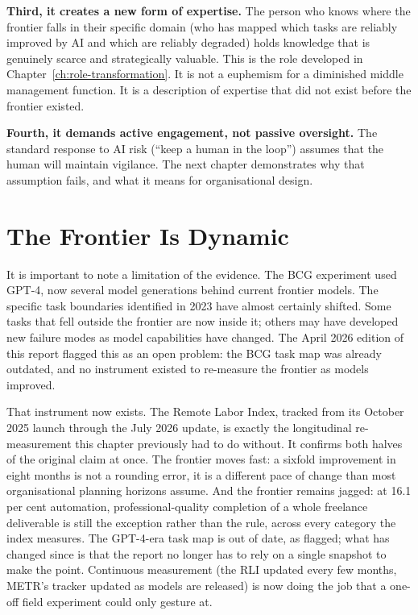 \textbf{Third, it creates a new form of expertise.} The person who knows where the frontier falls in their specific domain (who has mapped which tasks are reliably improved by AI and which are reliably degraded) holds knowledge that is genuinely scarce and strategically valuable. This is the  role developed in Chapter~\ref{ch:role-transformation}. It is not a euphemism for a diminished middle management function. It is a description of expertise that did not exist before the frontier existed.

\textbf{Fourth, it demands active engagement, not passive oversight.} The standard response to AI risk (``keep a human in the loop'') assumes that the human will maintain vigilance. The next chapter demonstrates why that assumption fails, and what it means for organisational design.

\section{The Frontier Is Dynamic}

It is important to note a limitation of the evidence. The BCG experiment used GPT-4, now several model generations behind current frontier models. The specific task boundaries identified in 2023 have almost certainly shifted. Some tasks that fell outside the frontier are now inside it; others may have developed new failure modes as model capabilities have changed. The April 2026 edition of this report flagged this as an open problem: the BCG task map was already outdated, and no instrument existed to re-measure the frontier as models improved.

That instrument now exists. The Remote Labor Index, tracked from its October 2025 launch through the July 2026 update, is exactly the longitudinal re-measurement this chapter previously had to do without. It confirms both halves of the original claim at once. The frontier moves fast: a sixfold improvement in eight months is not a rounding error, it is a different pace of change than most organisational planning horizons assume. And the frontier remains jagged: at 16.1 per cent automation, professional-quality completion of a whole freelance deliverable is still the exception rather than the rule, across every category the index measures. The GPT-4-era task map is out of date, as flagged; what has changed since is that the report no longer has to rely on a single snapshot to make the point. Continuous measurement (the RLI updated every few months, METR's tracker updated as models are released) is now doing the job that a one-off field experiment could only gesture at.

